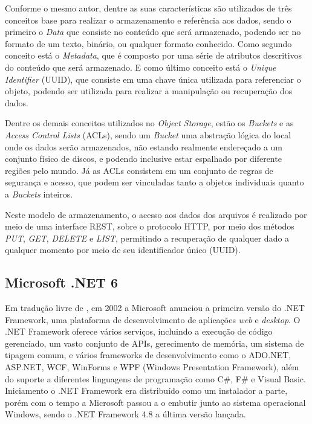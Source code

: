 Conforme o mesmo autor, dentre as suas características são utilizados de três
conceitos base para realizar o armazenamento e referência aos dados, sendo
o primeiro o \emph{Data} que consiste no conteúdo que será armazenado,
podendo ser no formato de um texto, binário, ou qualquer formato conhecido.
Como segundo conceito está o \emph{Metadata}, que é composto por uma série de
atributos descritivos do conteúdo que será armazenado. E como último conceito está
o \emph{Unique Identifier} (UUID), que consiste em uma chave única utilizada
para referenciar o objeto, podendo ser utilizada para realizar a manipulação ou
recuperação dos dados.

Dentre os demais conceitos utilizados no \emph{Object Storage}, estão os
\emph{Buckets} e as \emph{Access Control Lists} (ACLs), sendo um \emph{Bucket}
uma abstração lógica do local onde os dados serão armazenados, não estando
realmente endereçado a um conjunto físico de discos, e podendo inclusive
estar espalhado por diferente regiões pelo mundo. Já as ACLs consistem em
um conjunto de regras de segurança e acesso, que podem ser vinculadas
tanto a objetos individuais quanto a \emph{Buckets} inteiros.

Neste modelo de armazenamento, o acesso aos dados dos arquivos é realizado por meio
de uma interface REST, sobre o protocolo HTTP, por meio dos métodos \emph{PUT},
\emph{GET}, \emph{DELETE} e \emph{LIST}, permitindo a recuperação de qualquer
dado a qualquer momento por meio de seu identificador único (UUID).

\subsection{Microsoft .NET 6}

Em tradução livre de \cite{Akella:2022}, em 2002 a Microsoft anunciou a primeira
versão do .NET Framework, uma plataforma de desenvolvimento de aplicações
\emph{web} e \emph{desktop}. O .NET Framework oferece vários serviços, incluindo a
execução de código gerenciado, um vasto conjunto de APIs, gerecimento
de memória, um sistema de tipagem comum, e vários frameworks de desenvolvimento
como o ADO.NET, ASP.NET, WCF, WinForms e WPF (Windows Presentation Framework),
além do suporte a diferentes linguagens de programação como C\#, F\# e Visual Basic.
Iniciamento o .NET Framework era distribuído como um instalador a parte, porém
com o tempo a Microsoft passou a o embutir junto ao sistema operacional Windows,
sendo o .NET Framework 4.8 a última versão lançada.

